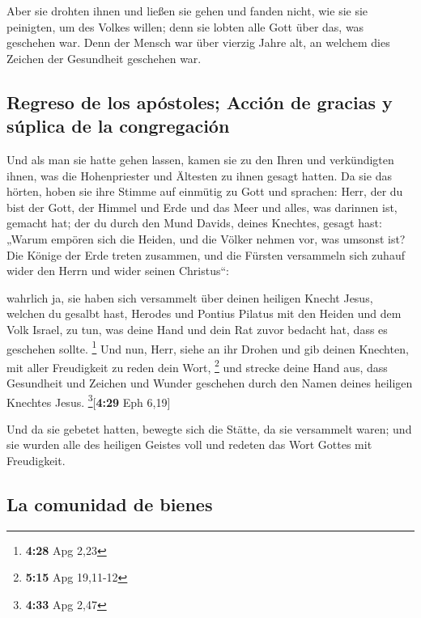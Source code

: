  Aber sie drohten ihnen und ließen sie gehen und fanden
nicht, wie sie sie peinigten, um des Volkes willen; denn sie lobten alle
Gott über das, was geschehen war.  Denn der Mensch war
über vierzig Jahre alt, an welchem dies Zeichen der Gesundheit geschehen
war.

\hypertarget{regreso-de-los-apuxf3stoles-acciuxf3n-de-gracias-y-suxfaplica-de-la-congregaciuxf3n}{%
\subsection{Regreso de los apóstoles; Acción de gracias y súplica de la
congregación}\label{regreso-de-los-apuxf3stoles-acciuxf3n-de-gracias-y-suxfaplica-de-la-congregaciuxf3n}}

 Und als man sie hatte gehen lassen, kamen sie zu den
Ihren und verkündigten ihnen, was die Hohenpriester und Ältesten zu
ihnen gesagt hatten.  Da sie das hörten, hoben sie ihre
Stimme auf einmütig zu Gott und sprachen: Herr, der du bist der Gott,
der Himmel und Erde und das Meer und alles, was darinnen ist, gemacht
hat;  der du durch den Mund Davids, deines Knechtes,
gesagt hast: „Warum empören sich die Heiden, und die Völker nehmen vor,
was umsonst ist?  Die Könige der Erde treten zusammen,
und die Fürsten versammeln sich zuhauf wider den Herrn und wider seinen
Christus``:

 wahrlich ja, sie haben sich versammelt über deinen
heiligen Knecht Jesus, welchen du gesalbt hast, Herodes und Pontius
Pilatus mit den Heiden und dem Volk Israel,  zu tun, was
deine Hand und dein Rat zuvor bedacht hat, dass es geschehen sollte.
\footnote{\textbf{4:28} Apg 2,23}  Und nun, Herr, siehe
an ihr Drohen und gib deinen Knechten, mit aller Freudigkeit zu reden
dein Wort, \footnote{\textbf{5:15} Apg 19,11-12}  und
strecke deine Hand aus, dass Gesundheit und Zeichen und Wunder geschehen
durch den Namen deines heiligen Knechtes Jesus.
\footnote{\textbf{4:33} Apg 2,47}{[}\textbf{4:29} Eph 6,19{]}

 Und da sie gebetet hatten, bewegte sich die Stätte, da
sie versammelt waren; und sie wurden alle des heiligen Geistes voll und
redeten das Wort Gottes mit Freudigkeit.

\hypertarget{la-comunidad-de-bienes}{%
\subsection{La comunidad de bienes}\label{la-comunidad-de-bienes}}

